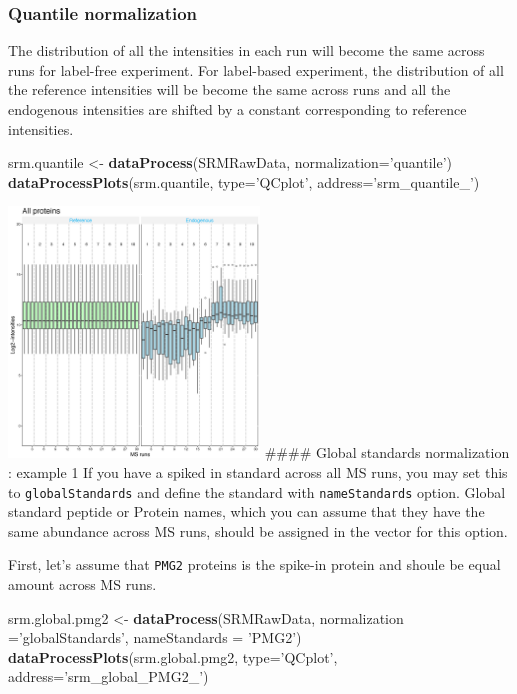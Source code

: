 \documentclass[]{book}
\newenvironment{Shaded}{\begin{snugshade}}{\end{snugshade}}
\newcommand{\DataTypeTok}[1]{\textcolor[rgb]{0.13,0.29,0.53}{#1}}
\newcommand{\KeywordTok}[1]{\textcolor[rgb]{0.13,0.29,0.53}{\textbf{#1}}}
\newcommand{\NormalTok}[1]{#1}
\newcommand{\StringTok}[1]{\textcolor[rgb]{0.31,0.60,0.02}{#1}}
\begin{document}
\hypertarget{quantile-normalization}{%
\subsubsection{Quantile normalization}\label{quantile-normalization}}

The distribution of all the intensities in each run will become the same across runs for
label-free experiment. For label-based experiment, the distribution of all the reference intensities
will be become the same across runs and all the endogenous intensities are shifted by a constant
corresponding to reference intensities.

\begin{Shaded}
\begin{Highlighting}[]
\NormalTok{srm.quantile <-}\StringTok{ }\KeywordTok{dataProcess}\NormalTok{(SRMRawData, }\DataTypeTok{normalization=}\StringTok{'quantile'}\NormalTok{)}
\KeywordTok{dataProcessPlots}\NormalTok{(srm.quantile, }\DataTypeTok{type=}\StringTok{'QCplot'}\NormalTok{, }\DataTypeTok{address=}\StringTok{'srm_quantile_'}\NormalTok{)}
\end{Highlighting}
\end{Shaded}

\includegraphics[width=0.5\textwidth,height=\textheight]{img/srm_quantile_QCPlot.png}
\#\#\#\# Global standards normalization : example 1
If you have a spiked in standard across all MS runs, you may set this to \texttt{globalStandards} and define the standard with \texttt{nameStandards} option. Global standard peptide or Protein names, which you can assume that they have the same abundance across MS runs, should be assigned in the vector for this option.

First, let's assume that \texttt{PMG2} proteins is the spike-in protein and shoule be equal amount across MS runs.

\begin{Shaded}
\begin{Highlighting}[]
\NormalTok{srm.global.pmg2 <-}\StringTok{ }\KeywordTok{dataProcess}\NormalTok{(SRMRawData, }\DataTypeTok{normalization =}\StringTok{'globalStandards'}\NormalTok{,}
                               \DataTypeTok{nameStandards =} \StringTok{'PMG2'}\NormalTok{)}
\KeywordTok{dataProcessPlots}\NormalTok{(srm.global.pmg2, }\DataTypeTok{type=}\StringTok{'QCplot'}\NormalTok{, }\DataTypeTok{address=}\StringTok{'srm_global_PMG2_'}\NormalTok{)}
\end{Highlighting}
\end{Shaded}
\end{document}
